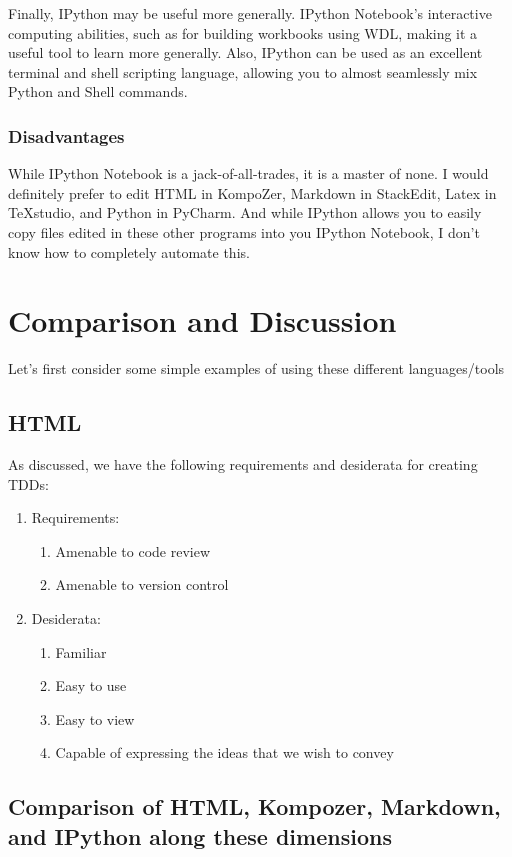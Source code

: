 \documentclass[]{article}
\begin{document}
		Finally, IPython may be useful more generally.  IPython Notebook's interactive computing abilities, such as for building workbooks using WDL, making it a useful tool to learn more generally.  Also, IPython can be used as an excellent terminal and shell scripting language, allowing you to almost seamlessly mix Python and Shell commands.
	\subsubsection{Disadvantages}
		While IPython Notebook is a jack-of-all-trades, it is a master of none.  I would definitely prefer to edit HTML in KompoZer, Markdown in StackEdit, Latex in TeXstudio, and Python in PyCharm.  And while IPython allows you to easily copy files edited in these other programs into you IPython Notebook, I don't know how to completely automate this.
		


\section{Comparison and Discussion}
Let's first consider some simple examples of using these different languages/tools

\subsection{HTML}
As discussed, we have the following requirements and desiderata for creating TDDs:

\begin{enumerate}
	\item Requirements:
		\begin{enumerate}
			\item Amenable to code review
			\item Amenable to version control
		\end{enumerate}
	\item Desiderata:
		\begin{enumerate}
			\item Familiar
			\item Easy to use
			\item Easy to view
			\item Capable of expressing the ideas that we wish to convey
			
		\end{enumerate}
\end{enumerate}

\subsection{Comparison of HTML, Kompozer, Markdown, and IPython along these dimensions}
\end{document}
